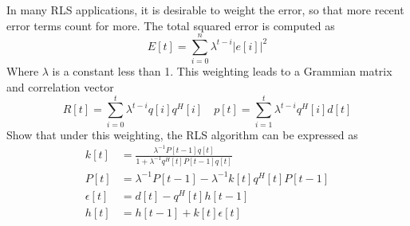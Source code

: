 \documentclass{homework}
\begin{document}
\begin{problem}[4-51]
  In many RLS applications, it is desirable to weight the error, so that more recent error terms count for more. The total squared error is computed as
  \[ E[t] = \sum_{i=0}^{n}  \lambda^{t-i}|e[i]|^2\]
  Where $\lambda$ is a constant less than 1. This weighting leads to a Grammian matrix and correlation vector
  \[R[t] = \sum^{t}_{i=0} \lambda^{t-i}q[i]q^H[i] \quad p[t] = \sum^{t}_{i=1} \lambda^{t-i}q^H[i]d[t]\]
  Show that under this weighting, the RLS algorithm can be expressed as
  \[
    \begin{aligned}
      k[t] &= \frac{\lambda^{-1}P[t-1]q[t]}{1 + \lambda^{-1}q^H[t]P[t-1]q[t]} \\
      P[t] &= \lambda^{-1}P[t-1] - \lambda^{-1}k[t]q^H[t]P[t-1] \\
      \epsilon[t] &= d[t] - q^H[t]h[t-1] \\
      h[t] &= h[t-1] + k[t]\epsilon[t]
    \end{aligned}
  \]
\end{problem}

\begin{solution}
  
\end{solution}
\end{document}
